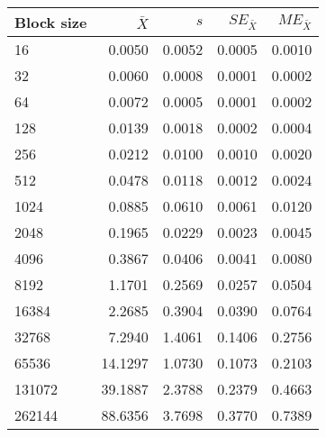 \begin{tabular}{lrrrr}\toprule
{\small Block size} & $\bar{X}$ & $s$ & $SE_{\bar{X}}$ & $ME_{\bar{X}}$ \\\midrule
16 & 0.0050 & 0.0052 & 0.0005 & 0.0010\\
32 & 0.0060 & 0.0008 & 0.0001 & 0.0002\\
64 & 0.0072 & 0.0005 & 0.0001 & 0.0002\\
128 & 0.0139 & 0.0018 & 0.0002 & 0.0004\\
256 & 0.0212 & 0.0100 & 0.0010 & 0.0020\\
512 & 0.0478 & 0.0118 & 0.0012 & 0.0024\\
1024 & 0.0885 & 0.0610 & 0.0061 & 0.0120\\
2048 & 0.1965 & 0.0229 & 0.0023 & 0.0045\\
4096 & 0.3867 & 0.0406 & 0.0041 & 0.0080\\
8192 & 1.1701 & 0.2569 & 0.0257 & 0.0504\\
16384 & 2.2685 & 0.3904 & 0.0390 & 0.0764\\
32768 & 7.2940 & 1.4061 & 0.1406 & 0.2756\\
65536 & 14.1297 & 1.0730 & 0.1073 & 0.2103\\
131072 & 39.1887 & 2.3788 & 0.2379 & 0.4663\\
262144 & 88.6356 & 3.7698 & 0.3770 & 0.7389\\
\bottomrule
\end{tabular}
